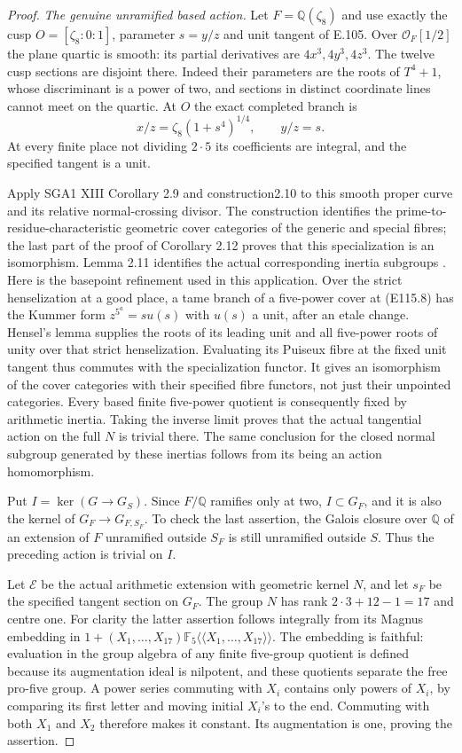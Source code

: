 \begin{proof}
\emph{The genuine unramified based action.}
Let $F=\mathbb Q(\zeta_8)$ and use exactly the cusp
$O=[\zeta_8:0:1]$, parameter $s=y/z$ and unit tangent of
E.105.  Over $\mathcal O_F[1/2]$ the plane quartic is smooth:
its partial derivatives are $4x^3,4y^3,4z^3$.
The twelve cusp sections are disjoint there.  Indeed their
parameters are the roots of $T^4+1$, whose discriminant is
a power of two, and sections in distinct coordinate lines
cannot meet on the quartic.
At $O$ the exact completed branch is
\[
       x/z=\zeta_8(1+s^4)^{1/4},\qquad y/z=s.
 \tag{E115.8}
\]
At every finite place not dividing $2\cdot5$ its coefficients
are integral, and the specified tangent is a unit.

Apply SGA1 XIII Corollary 2.9 and construction2.10 to this
smooth proper curve and its relative normal-crossing divisor.
The construction identifies the prime-to-residue-characteristic
geometric cover categories of the generic and special fibres;
the last part of the proof of Corollary 2.12 proves that this
specialization is an isomorphism.  Lemma 2.11 identifies the
actual corresponding inertia subgroups
\cite[XIII,2.9--2.12 and their proofs]{E_SGA1}.
Here is the basepoint refinement used in this application.
Over the strict henselization at a good place, a tame branch
of a five-power cover at (E115.8) has the Kummer form
$z^{5^a}=s u(s)$ with $u(s)$ a unit, after an etale change.
Hensel's lemma supplies the roots of its leading unit and all
five-power roots of unity over that strict henselization.
Evaluating its Puiseux fibre at the fixed unit tangent thus
commutes with the specialization functor.
It gives an isomorphism of the cover categories with their
specified fibre functors, not just their unpointed categories.
Every based finite five-power quotient is consequently fixed
by arithmetic inertia.  Taking the inverse limit proves that
the actual tangential action on the full $N$ is trivial there.
The same conclusion for the closed normal subgroup generated
by these inertias follows from its being an action homomorphism.

Put $I=\ker(G\to G_S)$.  Since $F/\mathbb Q$ ramifies only
at two, $I\subset G_F$, and it is also the kernel of
$G_F\to G_{F,S_F}$.  To check the last assertion, the Galois
closure over $\mathbb Q$ of an extension of $F$ unramified
outside $S_F$ is still unramified outside $S$.
Thus the preceding action is trivial on $I$.

Let $\mathcal E$ be the actual arithmetic extension with
geometric kernel $N$, and let $s_F$ be the specified tangent
section on $G_F$.  The group $N$ has rank
$2\cdot3+12-1=17$ and centre one.
For clarity the latter assertion follows integrally from its
Magnus embedding in $1+(X_1,\ldots,X_{17})
\mathbb F_5\langle\!\langle X_1,\ldots,X_{17}\rangle\!\rangle$.
The embedding is faithful: evaluation in the group algebra
of any finite five-group quotient is defined because its
augmentation ideal is nilpotent, and these quotients separate
the free pro-five group.  A power series commuting with $X_i$
contains only powers of $X_i$, by comparing its first letter
and moving initial $X_i$'s to the end.  Commuting with both
$X_1$ and $X_2$ therefore makes it constant.  Its augmentation
is one, proving the assertion.


\end{proof}
